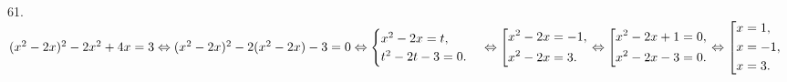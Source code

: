 61. $(x^2-2x)^2-2x^2+4x=3\Leftrightarrow(x^2-2x)^2-2(x^2-2x)-3=0\Leftrightarrow\begin{cases}x^2-2x=t,\\ t^2-2t-3=0.\end{cases}
\Leftrightarrow\left[
      \begin{gathered}
      x^2-2x=-1,\hfill\\
      x^2-2x=3.\hfill
      \end{gathered}\right.\Leftrightarrow\left[
      \begin{gathered}
      x^2-2x+1=0,\hfill\\
      x^2-2x-3=0.\hfill
      \end{gathered}\right.\Leftrightarrow\left[
      \begin{gathered}
      x=1,\hfill\\
      x=-1,\hfill\\
      x=3.\hfill
      \end{gathered}\right.$\\
